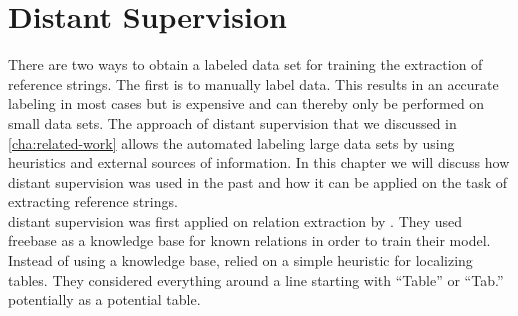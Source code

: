 \chapter{Distant Supervision}\label{cha:distant-supervision}


There are two ways to obtain a labeled data set for training the extraction of reference strings.
The first is to manually label data.
This results in an accurate labeling in most cases but is expensive and can thereby only be performed on small data sets.
The approach of \gls{distant supervision} that we discussed in \cref{cha:related-work} allows the automated labeling large data sets by using heuristics and external sources of information.
In this chapter we will discuss how \gls{distant supervision} was used in the past and how it can be applied on the task of extracting reference strings.\\

\Gls{distant supervision} was first applied on relation extraction by \citet{mintz2009distant}.
They used \gls{freebase} as a knowledge base for known relations in order to train their model.
Instead of using a knowledge base, \citet{fan2015detecting} relied on a simple heuristic for localizing tables.
They considered everything around a line starting with ``Table'' or ``Tab.'' potentially as a potential table.





%
